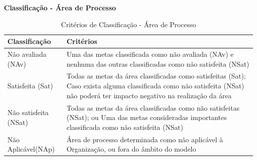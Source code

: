 \documentclass[openany,10pt,a4paper]{article}
\begin{document}
\begin{appendix}
\begin{table}[H]
	\textbf{Classificação - Área de Processo}
		\centering
		\caption{Critérios de Classificação - Área de Processo}
		\begin{tabular}{|p{1in}p{5in}|}		
			\hline
			\textbf{Classificação}  & \textbf{Critérios}\\ 
			\hline
			Não avaliada (NAv) & Uma das metas classificada como não avaliada (NAv) e nenhuma das
			outras classificadas como não satisfeita (NSat) \\
			\hline
			Satisfeita (Sat) & Todas as metas da área classificadas como satisfeitas (Sat);
			Caso exista alguma classificada como não satisfeita (NSat) não poderá
			ter impacto negativo na realização da área \\
			\hline
			Não satisfeita (NSat) & Todas as metas da área classificadas como não satisfeitas (NSat); ou
			Uma das metas consideradas importantes classificada como não
			satisfeita (NSat) \\
			\hline
			Não Aplicável(NAp) & Área de processo determinada como não aplicável à Organização, ou
			fora do âmbito do modelo \\
			\hline
		\end{tabular} 
\end{table}


\end{appendix}
\end{document}
